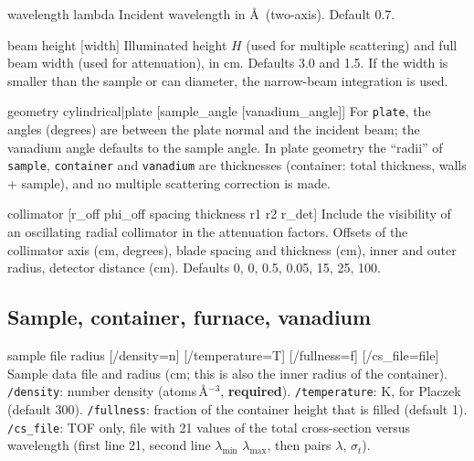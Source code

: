 \documentclass[11pt,a4paper]{report}
\newcommand{\cmd}[1]{\texttt{\color{accent}#1}}
\newcommand{\code}[1]{\texttt{#1}}
\begin{document}
\begin{cmdbox}{wavelength  lambda}
Incident wavelength in \AA\ (two-axis). Default 0.7.
\end{cmdbox}

\begin{cmdbox}{beam  height  [width]}
Illuminated height $H$ (used for multiple scattering) and full beam width (used
for attenuation), in cm. Defaults 3.0 and 1.5. If the width is smaller than
the sample or can diameter, the narrow-beam integration is used.
\end{cmdbox}

\begin{cmdbox}{geometry  cylindrical|plate  [sample\_angle  [vanadium\_angle]]}
For \code{plate}, the angles (degrees) are between the plate normal and the
incident beam; the vanadium angle defaults to the sample angle. In plate geometry
the ``radii'' of \cmd{sample}, \cmd{container} and \cmd{vanadium} are
thicknesses (container: total thickness, walls + sample), and no multiple
scattering correction is made.
\end{cmdbox}

\begin{cmdbox}{collimator  [r\_off  phi\_off  spacing  thickness  r1  r2  r\_det]}
Include the visibility of an oscillating radial collimator in the attenuation
factors. Offsets of the collimator axis (cm, degrees), blade spacing and
thickness (cm), inner and outer radius, detector distance (cm). Defaults
0, 0, 0.5, 0.05, 15, 25, 100.
\end{cmdbox}

\subsection{Sample, container, furnace, vanadium}

\begin{cmdbox}{sample  file  radius  [/density=n] [/temperature=T] [/fullness=f] [/cs\_file=file]}
Sample data file and radius (cm; this is also the inner radius of the container).
\code{/density}: number density (atoms\,\AA$^{-3}$, \textbf{required}).
\code{/temperature}: K, for Placzek (default 300).
\code{/fullness}: fraction of the container height that is filled (default 1).
\code{/cs\_file}: TOF only, file with 21 values of the total cross-section versus
wavelength (first line 21, second line $\lambda_{\min}$ $\lambda_{\max}$, then
pairs $\lambda$, $\sigma_t$).
\end{cmdbox}
\end{document}
